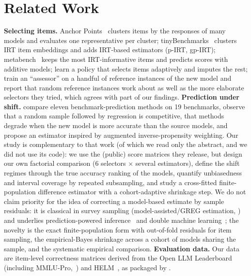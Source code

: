 \section{Related Work}
\label{sec:related}
\textbf{Selecting items.} Anchor Points~\citep{vivek2024anchor} clusters items by the responses of many models and evaluates one representative per cluster; tinyBenchmarks~\citep{maiapolo2024tiny} clusters IRT item embeddings and adds IRT-based estimators (p-IRT, gp-IRT); metabench~\citep{kipnis2025metabench} keeps the most IRT-informative items and predicts scores with additive models; \citet{li2025active} learn a policy that selects items adaptively and imputes the rest; \citet{pacchiardi2024100} train an ``assessor'' on a handful of reference instances of the new model and report that random reference instances work about as well as the more elaborate selectors they tried, which agrees with part of our findings.
\textbf{Prediction under shift.} \citet{zhang2025benchmark} compare eleven benchmark-prediction methods on 19 benchmarks, observe that a random sample followed by regression is competitive, that methods degrade when the new model is more accurate than the source models, and propose an estimator inspired by augmented inverse-propensity weighting.
Our study is complementary to that work (of which we read only the abstract, and we did not use its code): we use the (public) score matrices they release, but design our own factorial comparison (6 selectors $\times$ several estimators), define the shift regimes through the true accuracy ranking of the models, quantify unbiasedness and interval coverage by repeated subsampling, and study a cross-fitted finite-population difference estimator with a cohort-adaptive shrinkage step. We do not claim priority for the idea of correcting a model-based estimate by sample residuals: it is classical in survey sampling (model-assisted/GREG estimation, \citealt{sarndal1992model}) and underlies prediction-powered inference~\citep{angelopoulos2023ppi} and double machine learning~\citep{chernozhukov2018dml}; the novelty is the exact finite-population form with out-of-fold residuals for item sampling, the empirical-Bayes shrinkage across a cohort of models sharing the sample, and the systematic empirical comparison.
\textbf{Evaluation data.} Our data are item-level correctness matrices derived from the Open LLM Leaderboard~\citep{fourrier2024openllm} (including MMLU-Pro,~\citealt{wang2024mmlupro}) and HELM~\citep{liang2023helm}, as packaged by \citet{zhang2025benchmark}.
